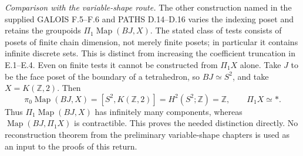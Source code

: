 \medskip
\noindent\emph{Comparison with the variable-shape route.}
The other construction named in the supplied GALOIS F.5--F.6 and
PATHS D.14--D.16 varies the indexing poset and retains the groupoids
$\Pi_1\operatorname{Map}(BJ,X)$. The stated class of tests consists
of posets of finite chain dimension, not merely finite posets;
in particular it contains infinite discrete sets. This is distinct
from increasing the coefficient truncation in E.1--E.4.
Even on finite tests it cannot be constructed from $\Pi_1X$ alone.
Take $J$ to be the face poset of the boundary of a tetrahedron, so
$BJ\simeq S^2$, and take $X=K(\mathbb Z,2)$. Then
\[
 \pi_0\operatorname{Map}(BJ,X)
       =[S^2,K(\mathbb Z,2)]
       =H^2(S^2;\mathbb Z)=\mathbb Z,
 \qquad \Pi_1X\simeq *.
\]
Thus $\Pi_1\operatorname{Map}(BJ,X)$ has infinitely many components,
whereas $\operatorname{Map}(BJ,\Pi_1X)$ is contractible.
This proves the needed distinction directly. No reconstruction
theorem from the preliminary variable-shape chapters is used as
an input to the proofs of this return.
